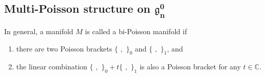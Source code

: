 \documentclass[10pt,a4paper]{amsart}
\numberwithin{equation}{section}
\begin{document}
\subsection[Multi-Poisson structure on $\mathfrak{g}^0_n$]{Multi-Poisson structure on $\boldsymbol{\mathfrak{g}^0_n}$}\label{section2.2}

In general, a manifold $M$ is called a bi-Poisson manifold if
\begin{enumerate}\itemsep=0pt
\item[(i)] there are two Poisson brackets $\{ \,\, , \,\, \}_0$ and $\{ \,\, , \,\, \}_1$, and
\item[(ii)] the linear combination $\{ \,\, , \,\, \}_0 + t \{ \,\,, \,\, \}_1$ is also a Poisson bracket for any $t\in \mathbb{C}$.
\end{enumerate}
\end{document}
